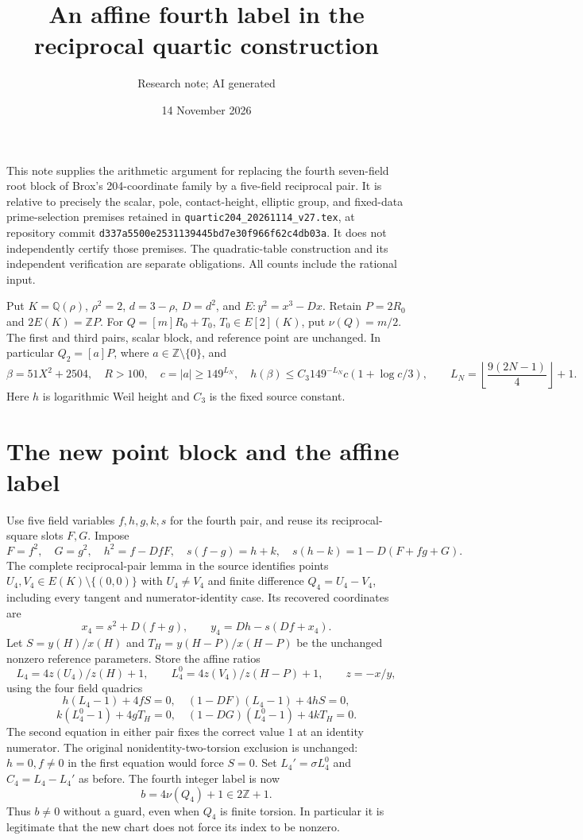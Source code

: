 \documentclass[11pt]{article}
\title{An affine fourth label in the reciprocal quartic construction}
\author{Research note; AI generated}
\date{14 November 2026}
\newcommand{\Q}{\mathbb Q}\newcommand{\Z}{\mathbb Z}
\begin{document}
\maketitle

This note supplies the arithmetic argument for replacing the fourth
seven-field root block of Brox's 204-coordinate family by a five-field
reciprocal pair. It is relative to precisely the scalar, pole,
contact-height, elliptic group, and fixed-data prime-selection premises
retained in \texttt{quartic204\_20261114\_v27.tex}, at repository commit
\texttt{d337a5500e2531139445bd7e30f966f62c4db03a}.
It does not independently certify those premises. The quadratic-table
construction and its independent verification are separate obligations.
All counts include the rational input.

Put $K=\Q(\rho)$, $\rho^2=2$, $d=3-\rho$, $D=d^2$, and
$E:y^2=x^3-Dx$. Retain $P=2R_0$ and $2E(K)=\Z P$.
For $Q=[m]R_0+T_0$, $T_0\in E[2](K)$, put $\nu(Q)=m/2$.
The first and third pairs, scalar block, and reference point are unchanged.
In particular $Q_2=[a]P$, where $a\in\Z\setminus\{0\}$, and
\[
 \beta=51X^2+2504,\quad R>100,\quad
 c=|a|\ge149^{L_N},\quad
 h(\beta)\le C_3 149^{-L_N}c(1+\log c/3),
 \qquad L_N=\left\lfloor\frac{9(2N-1)}4\right\rfloor+1.
\]
Here $h$ is logarithmic Weil height and $C_3$ is the fixed source constant.

\section*{The new point block and the affine label}
Use five field variables $f,h,g,k,s$ for the fourth pair, and reuse its
reciprocal-square slots $F,G$. Impose
\[
 F=f^2,\quad G=g^2,\quad h^2=f-DfF,\quad
 s(f-g)=h+k,\quad s(h-k)=1-D(F+fg+G).
\]
The complete reciprocal-pair lemma in the source identifies points
$U_4,V_4\in E(K)\setminus\{(0,0)\}$ with $U_4\ne V_4$ and finite difference
$Q_4=U_4-V_4$, including every tangent and numerator-identity case.
Its recovered coordinates are
\[
 x_4=s^2+D(f+g),\qquad y_4=Dh-s(Df+x_4).
\]
Let $S=y(H)/x(H)$ and $T_H=y(H-P)/x(H-P)$ be the unchanged nonzero
reference parameters. Store the affine ratios
\[
 L_4=4z(U_4)/z(H)+1,\qquad L_4^0=4z(V_4)/z(H-P)+1,
 \qquad z=-x/y,
\]
using the four field quadrics
\[
 h(L_4-1)+4fS=0,\quad (1-DF)(L_4-1)+4hS=0,
\]
\[
 k(L_4^0-1)+4gT_H=0,\quad (1-DG)(L_4^0-1)+4kT_H=0.
\]
The second equation in either pair fixes the correct value $1$ at an
identity numerator. The original nonidentity-two-torsion exclusion is
unchanged: $h=0,f\ne0$ in the first equation would force $S=0$.
Set $L_4'=\sigma L_4^0$ and $C_4=L_4-L_4'$ as before.
The fourth integer label is now
\[
                  b=4\nu(Q_4)+1\in2\Z+1.
\]
Thus $b\ne0$ without a guard, even when $Q_4$ is finite torsion.
In particular it is legitimate that the new chart does not force its
index to be nonzero.
\end{document}
